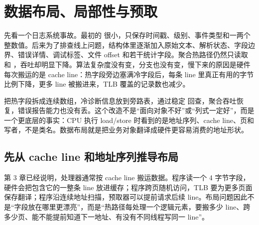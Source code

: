 \chapter{数据布局、局部性与预取}

先看一个日志系统事故。最初的  很小，只保存时间戳、级别、事件类型和一两个整数值。后来为了排查线上问题，结构体里逐渐加入原始文本、解析状态、字段边界、错误详情、调试标签、文件 offset 和若干统计字段。聚合热路径仍然只读取  和 ，吞吐却明显下降。算法复杂度没有变，分支也没有变，慢下来的原因是硬件每次搬运的是 cache line：热字段旁边塞满冷字段后，每条 line 里真正有用的字节比例下降，更多 line 被搬进来，TLB 覆盖的记录数也减少。

把热字段拆成连续数组，冷诊断信息放到旁路表，通过稳定  回查，聚合吞吐恢复，错误报告能力也没有丢。这个改造不是“面向对象不好”或“列式一定好”，而是一个更底层的事实：CPU 执行 load/store 时看到的是地址序列、cache line、页和写者，不是类名。数据布局就是把业务对象翻译成硬件更容易消费的地址形状。

\section{先从 cache line 和地址序列推导布局}

第 3 章已经说明，处理器通常按 cache line 搬运数据。程序读一个 4 字节字段，硬件会把包含它的一整条 line 放进缓存；程序跨页随机访问，TLB 要为更多页面保存翻译；程序沿连续地址扫描，预取器可以提前请求后续 line。布局问题因此不是“字段放在哪里更漂亮”，而是“热路径每处理一个逻辑元素，要搬多少 line、跨多少页、能不能提前知道下一地址、有没有不同线程写同一 line”。

